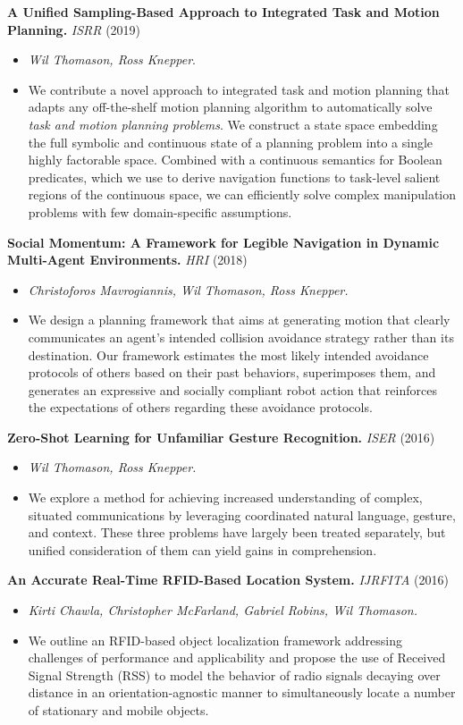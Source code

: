 \documentclass[10pt]{article}
\newenvironment{innerlist}[1][\enskip\textbullet]%
{\begin{itemize}[#1,leftmargin=*,parsep=0pt,itemsep=0pt,topsep=0pt,partopsep=0pt]}
		{\end{itemize}}
\begin{document}
\textbf{A Unified Sampling-Based Approach to Integrated Task and Motion Planning.}
\emph{ISRR} (2019)
\begin{innerlist}
	\item[] \emph{Wil Thomason, Ross Knepper}.
	\item[] We contribute a novel approach to integrated task and motion planning that adapts any
	off-the-shelf motion planning algorithm to automatically solve \emph{task and motion planning
		problems}. We construct a state space embedding the full symbolic and continuous state of a
	planning problem into a single highly factorable space. Combined with a continuous semantics
	for Boolean predicates, which we use to derive navigation functions to task-level salient
	regions of the continuous space, we can efficiently solve complex manipulation problems with
	few domain-specific assumptions.
\end{innerlist}\bigskip

\textbf{Social Momentum: A Framework for Legible Navigation in Dynamic Multi-Agent Environments.}
\emph{HRI} (2018)
\begin{innerlist}
	\item[] \emph{Christoforos Mavrogiannis, Wil Thomason, Ross Knepper.}
	\item[] We design a planning framework that aims at generating motion that clearly communicates
	an agent’s intended collision avoidance strategy rather than its destination. Our framework
	estimates the most likely intended avoidance protocols of others based on their past
	behaviors, superimposes them, and generates an expressive and socially compliant robot action
	that reinforces the expectations of others regarding these avoidance protocols.
\end{innerlist}\bigskip

\textbf{Zero-Shot Learning for Unfamiliar Gesture Recognition.}
\emph{ISER} (2016)
\begin{innerlist}
	\item[] \emph{Wil Thomason, Ross Knepper.}
	\item[] We explore a method for achieving increased understanding of complex, situated
	communications by leveraging coordinated natural language, gesture, and context. These three
	problems have largely been treated separately, but unified consideration of them can yield
	gains in comprehension.
\end{innerlist}\bigskip

\textbf{An Accurate Real-Time RFID-Based Location System.}
\emph{IJRFITA} (2016)
\begin{innerlist}
	\item[] \emph{Kirti Chawla, Christopher McFarland, Gabriel Robins, Wil Thomason.}
	\item[] We outline an RFID-based object localization framework addressing challenges of
	performance and applicability and propose the use of Received Signal Strength (RSS) to model
	the behavior of radio signals decaying over distance in an orientation-agnostic manner to
	simultaneously locate a number of stationary and mobile objects.
\end{innerlist}
\end{document}
